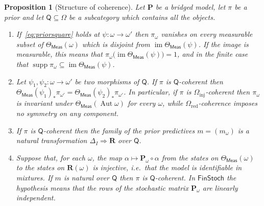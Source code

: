 \documentclass[11pt,a4paper]{article}
\theoremstyle{plain}
\newtheorem{proposition}[theorem]{Proposition}
\theoremstyle{definition}
\theoremstyle{remark}
\newcommand{\cat}[1]{\mathsf{#1}}
\newcommand{\catO}{\cat{\Omega}}
\newcommand{\Meas}{\cat{Meas}}
\newcommand{\FinStoch}{\cat{FinStoch}}
\begin{document}
\begin{proposition}[Structure of coherence]\label{prop:coherence}
Let $\mathbf P$ be a bridged model, let $\pi$ be a prior and let
$\cat{Q} \subseteq \catO$ be a subcategory which contains all the objects.
\begin{enumerate}
\item If~\eqref{eq:priorsquare} holds at $\psi \colon \omega \to \omega'$ then
$\pi_{\omega}$ vanishes on every measurable subset of $\Theta_\Meas(\omega)$
which is disjoint from $\operatorname{im}\Theta_\Meas(\psi)$. If the image is
measurable, this means that
$\pi_{\omega}\bigl(\operatorname{im}\Theta_\Meas(\psi)\bigr) = 1$, and in the
finite case that
$\operatorname{supp}\pi_{\omega} \subseteq \operatorname{im}\Theta_\Meas(\psi)$.
\item Let $\psi_1,\psi_2 \colon \omega \to \omega'$ be two morphisms of
$\cat{Q}$. If $\pi$ is $\cat{Q}$-coherent then
$\Theta_\Meas(\psi_1)_{*}\pi_{\omega'} = \Theta_\Meas(\psi_2)_{*}\pi_{\omega'}$.
In particular, if $\pi$ is $\catO_{\mathrm{inj}}$-coherent then $\pi_{\omega}$
is invariant under $\Theta_\Meas(\operatorname{Aut}\omega)$ for every
$\omega$, while $\catO_{\mathrm{red}}$-coherence imposes no symmetry on any
component.
\item If $\pi$ is $\cat{Q}$-coherent then the family of the prior predictives
$m = (m_{\omega})$ is a natural transformation
$\Delta_{I} \Rightarrow \mathbf{R}$ over $\cat{Q}$.
\item Suppose that, for each $\omega$, the map
$\alpha \mapsto \mathbf P_{\omega}\circ\alpha$ from the states on
$\Theta_\Meas(\omega)$ to the states on $\mathbf{R}(\omega)$ is injective,
i.e.\ that the model is identifiable in mixtures. If $m$ is natural over
$\cat{Q}$ then $\pi$ is $\cat{Q}$-coherent. In $\FinStoch$
the hypothesis means that the rows of the stochastic matrix
$\mathbf P_{\omega}$ are linearly independent.
\end{enumerate}
\end{proposition}
\end{document}
